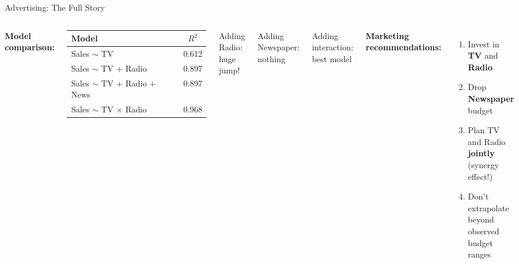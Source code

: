 \documentclass[aspectratio=169, 11pt]{beamer}
\begin{document}
\begin{frame}{Advertising: The Full Story}
\begin{columns}
\textbf{Model comparison:}

\begin{tabular}{lc}
\toprule
Model & $R^2$ \\
\midrule
Sales $\sim$ TV & 0.612 \\
Sales $\sim$ TV + Radio & 0.897 \\
Sales $\sim$ TV + Radio + News & 0.897 \\
Sales $\sim$ TV $\times$ Radio & \textcolor{softgreen}{0.968} \\
\bottomrule
\end{tabular}

\vspace{0.3em}
Adding Radio: huge jump!

Adding Newspaper: nothing

Adding interaction: best model

\textbf{Marketing recommendations:}

\begin{enumerate}
  \item Invest in \textbf{TV} and \textbf{Radio}
  \item Drop \textbf{Newspaper} budget
  \item Plan TV and Radio \textbf{jointly}\\
    (synergy effect!)
  \item Don't extrapolate beyond\\
    observed budget ranges
\end{enumerate}
\end{columns}
\end{frame}
\end{document}
